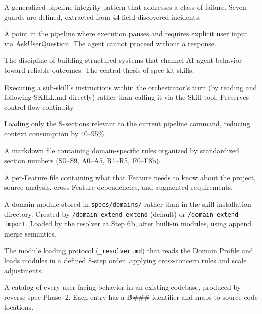 \documentclass[11pt,a4paper,openright,twoside]{report}
\newcommand{\cmd}[1]{\texttt{/#1}}
\newcommand{\file}[1]{\texttt{#1}}
\begin{document}
\begin{description}[style=nextline]
  \item[Guard] A generalized pipeline integrity pattern that addresses a class of failure. Seven guards are defined, extracted from 44 field-discovered incidents.

  \item[HARD STOP] A point in the pipeline where execution pauses and requires explicit user input via AskUserQuestion. The agent cannot proceed without a response.

  \item[Harness Engineering] The discipline of building structured systems that channel AI agent behavior toward reliable outcomes. The central thesis of spec-kit-skills.

  \item[Inline Execution] Executing a sub-skill's instructions within the orchestrator's turn (by reading and following SKILL.md directly) rather than calling it via the Skill tool. Preserves control flow continuity.

  \item[Lazy Loading] Loading only the S-sections relevant to the current pipeline command, reducing context consumption by 40--95\%.

  \item[Module] A markdown file containing domain-specific rules organized by standardized section numbers (S0--S9, A0--A5, R1--R5, F0--F8b).

  \item[Pre-context] A per-Feature file containing what that Feature needs to know about the project, source analysis, cross-Feature dependencies, and augmented requirements.

  \item[Project Module] A domain module stored in \file{specs/domains/} rather than in the skill installation directory. Created by \cmd{domain-extend extend} (default) or \cmd{domain-extend import}. Loaded by the resolver at Step 6b, after built-in modules, using append merge semantics.

  \item[Resolver] The module loading protocol (\file{\_resolver.md}) that reads the Domain Profile and loads modules in a defined 8-step order, applying cross-concern rules and scale adjustments.

  \item[SBI (Source Behavior Inventory)] A catalog of every user-facing behavior in an existing codebase, produced by reverse-spec Phase~2. Each entry has a B\#\#\# identifier and maps to source code locations.


\end{description}
\end{document}
